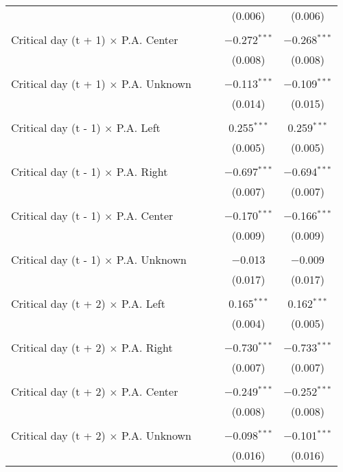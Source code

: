 \documentclass[
]{article}
\begin{document}
\begin{table}[!htbp]
{\begin{tabular}{@{\extracolsep{5pt}}lcccc}
  &  &  & (0.006) & (0.006) \\ 
  & & & & \\ 
 Critical day (t + 1) $\times$ P.A. Center &  &  & $-$0.272$^{***}$ & $-$0.268$^{***}$ \\ 
  &  &  & (0.008) & (0.008) \\ 
  & & & & \\ 
 Critical day (t + 1) $\times$ P.A. Unknown &  &  & $-$0.113$^{***}$ & $-$0.109$^{***}$ \\ 
  &  &  & (0.014) & (0.015) \\ 
  & & & & \\ 
 Critical day (t - 1) $\times$ P.A. Left &  &  & 0.255$^{***}$ & 0.259$^{***}$ \\ 
  &  &  & (0.005) & (0.005) \\ 
  & & & & \\ 
 Critical day (t - 1) $\times$ P.A. Right &  &  & $-$0.697$^{***}$ & $-$0.694$^{***}$ \\ 
  &  &  & (0.007) & (0.007) \\ 
  & & & & \\ 
 Critical day (t - 1) $\times$ P.A. Center &  &  & $-$0.170$^{***}$ & $-$0.166$^{***}$ \\ 
  &  &  & (0.009) & (0.009) \\ 
  & & & & \\ 
 Critical day (t - 1) $\times$ P.A. Unknown &  &  & $-$0.013 & $-$0.009 \\ 
  &  &  & (0.017) & (0.017) \\ 
  & & & & \\ 
 Critical day (t + 2) $\times$ P.A. Left &  &  & 0.165$^{***}$ & 0.162$^{***}$ \\ 
  &  &  & (0.004) & (0.005) \\ 
  & & & & \\ 
 Critical day (t + 2) $\times$ P.A. Right &  &  & $-$0.730$^{***}$ & $-$0.733$^{***}$ \\ 
  &  &  & (0.007) & (0.007) \\ 
  & & & & \\ 
 Critical day (t + 2) $\times$ P.A. Center &  &  & $-$0.249$^{***}$ & $-$0.252$^{***}$ \\ 
  &  &  & (0.008) & (0.008) \\ 
  & & & & \\ 
 Critical day (t + 2) $\times$ P.A. Unknown &  &  & $-$0.098$^{***}$ & $-$0.101$^{***}$ \\ 
  &  &  & (0.016) & (0.016) \\ 

\end{tabular}}
\end{table}
\end{document}

